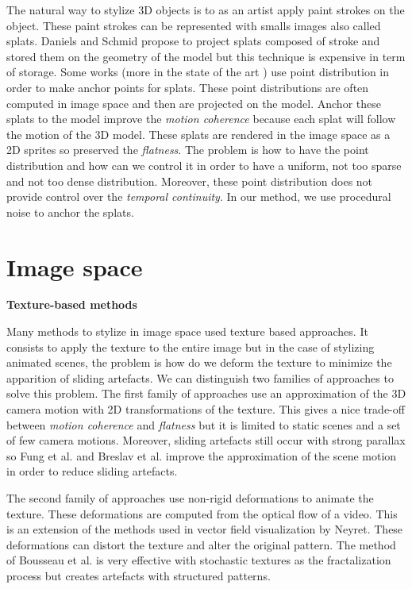The natural way to stylize 3D objects is to as an artist apply paint strokes on the object. These paint strokes can be represented with smalls images also called splats. Daniels\cite{Daniels_1999} and Schmid\cite{schmid_overcoat:_2011} propose to project splats composed of stroke and stored them on the geometry of the model but this technique is expensive in term of storage. Some works \cite{meier_painterly_1996, Fekete_2000, chi_stylized_2006}(more in the state of the art \cite{benard_state---art_2011}) use point distribution in order to make anchor points for splats. These point distributions are often computed in image space and then are projected on the model. Anchor these splats to the model improve the \textit{motion coherence} because each splat will follow the motion of the 3D model. These splats are rendered in the image space as a 2D sprites so preserved the \textit{flatness}. The problem is how to have the point distribution and how can we control it in order to have a uniform, not too sparse and not too dense distribution. Moreover, these point distribution does not provide control over the \textit{temporal continuity}. In our method, we use procedural noise to anchor the splats.


\section{Image space}

\textbf{Texture-based methods}

Many methods to stylize in image space used texture based approaches. It consists to apply the texture to the entire image \cite{benard_state---art_2011} but in the case of stylizing animated scenes, the problem is how do we deform the texture to minimize the apparition of sliding artefacts. We can distinguish two families of approaches to solve this problem. The first family of approaches use an approximation of the 3D camera motion with 2D transformations of the texture\cite{cunzi_dynamic_nodate}. This gives a nice trade-off between \textit{motion coherence} and \textit{flatness} but it is limited to static scenes and a set of few camera motions. Moreover, sliding artefacts still occur with strong parallax so Fung et al.\cite{fung_pen-and-ink_nodate} and Breslav et al.\cite{breslav_dynamic_nodate} improve the approximation of the scene motion in order to reduce sliding artefacts.

The second family of approaches use non-rigid deformations to animate the texture\cite{bousseau_video_2007}. These deformations are computed from the optical flow of a video. This is an extension of the methods used in vector field visualization by Neyret\cite{neyret_imagis-gravir_nodate}. These deformations can distort the texture and alter the original pattern. The method of Bousseau et al.\cite{bousseau_video_2007} is very effective with stochastic textures as the fractalization process but creates artefacts with structured patterns. \newline



